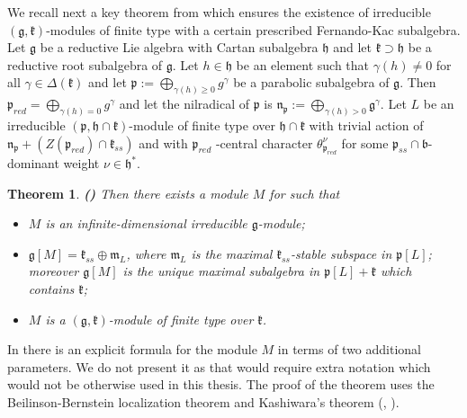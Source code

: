 \documentclass[12pt]{report}
\newtheorem{theo}{Theorem}[section]
\newcommand{\kk}{\mathfrak{k}}
\newcommand{\nn}{\mathfrak{n}}
\newcommand{\mm}{\mathfrak{m}}
\newcommand{\hh}{\mathfrak{h}}
\newcommand{\pp}{\mathfrak{p}}
\newcommand{\gG}{\mathfrak{g}}
\newcommand{\bb}{\mathfrak{b}}
\begin{document}
We recall next a key theorem from \cite{PSZ} which ensures the existence of irreducible $(\gG,\kk)$-modules of finite type with a certain prescribed Fernando-Kac subalgebra. Let $\gG$  be a reductive Lie algebra with Cartan subalgebra $\hh$ and let $\kk\supset\hh$ be a reductive root subalgebra of $\gG$. Let $h\in\hh$ be an element such that $\gamma(h)\neq 0$ for all $\gamma\in\Delta(\kk)$ and let $\pp:= \bigoplus_{\gamma(h)\geq 0} g^{\gamma}$ be a parabolic subalgebra of $\gG$. Then $\pp_{red}=\bigoplus_{\gamma(h)= 0} g^{\gamma}$ and let the nilradical of $\pp$ is $\nn_{\pp}:=\bigoplus_{\gamma(h)> 0} \gG^{\gamma}$. Let $L$ be an irreducible $(\pp, \hh\cap\kk)$-module of finite type over $\hh\cap\kk$ with trivial action of $\nn_{\pp}+ (Z(\pp_{red}) \cap \kk_{ss})$ and with $\pp_{red}$ -central character $\theta_{\pp_{red}}^\nu$ for some $\pp_{ss}\cap\bb$-dominant weight $\nu\in\hh^*$.
\begin{theo}\label{thPSZmain}
\textbf{(\cite[Theorem 4.3]{PSZ})} Then there exists a module $M$ for such that
\begin{itemize}
\item[(a)] $M$ is an infinite-dimensional irreducible $\gG$-module;
\item[(b)] $\gG[M] = \kk_{ss}\oplus \mm_L$, where $\mm_L$ is the maximal $\kk_{ss}$-stable subspace in $\pp[L]$; moreover $\gG [M ]$ is the unique maximal subalgebra in $\pp [L] + \kk$ which contains $\kk$;
\item[(c)] $M$ is a $(\gG, \kk)$-module of finite type over $\kk$.
\end{itemize}
\end{theo}
In \cite{PSZ} there is an explicit formula for the module $M$ in terms of two additional parameters. We do not present it as that would require extra notation which would not be otherwise used in this thesis. The proof of the theorem uses the Beilinson-Bernstein localization theorem and Kashiwara's theorem (\cite{Kashiwara:holonomic}, \cite{BeilinsonBerstein}).
\end{document}
